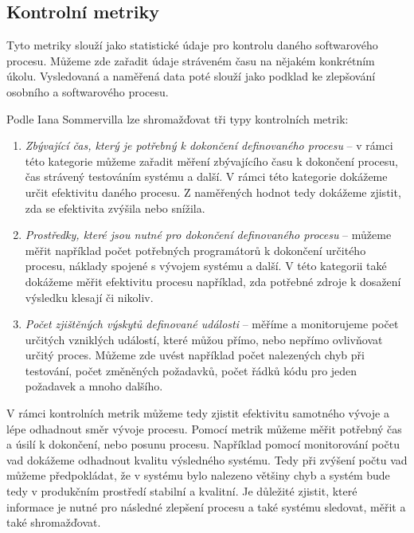 \documentclass[czech,master,public,dept460,male,cpdeclaration,oneside]{diploma}
\begin{document}
\subsection{Kontrolní metriky}
Tyto metriky slouží jako statistické údaje pro kontrolu daného softwarového procesu. Můžeme zde zařadit údaje stráveném času na nějakém konkrétním úkolu. Vysledovaná a naměřená data poté slouží jako podklad ke zlepšování osobního a softwarového procesu. 

Podle Iana Sommervilla \cite{ref:kontrolni_metriky} lze shromažďovat tři typy kontrolních metrik:

\begin{enumerate}
\item \textit{Zbývající čas, který je potřebný k dokončení definovaného procesu} -- v rámci této kategorie můžeme zařadit měření zbývajícího času k dokončení procesu, čas strávený testováním systému a další. V rámci této kategorie dokážeme určit efektivitu daného procesu. Z naměřených hodnot tedy dokážeme zjistit, zda se efektivita zvýšila nebo snížila.

\item \textit{Prostředky, které jsou nutné pro dokončení definovaného procesu} -- můžeme měřit například počet potřebných programátorů k dokončení určitého procesu, náklady spojené s vývojem systému a další. V této kategorii také dokážeme měřit efektivitu procesu například, zda potřebné zdroje k dosažení výsledku klesají či nikoliv.

\item \textit{Počet zjištěných výskytů definované události} -- měříme a monitorujeme počet určitých vzniklých událostí, které můžou přímo, nebo nepřímo ovlivňovat určitý proces. Můžeme zde uvést například počet nalezených chyb při testování, počet změněných požadavků, počet řádků kódu pro jeden požadavek a mnoho dalšího.

\end{enumerate}

V rámci kontrolních metrik můžeme tedy zjistit efektivitu samotného vývoje a lépe odhadnout směr vývoje procesu. Pomocí metrik můžeme měřit potřebný čas a úsilí k dokončení, nebo posunu procesu. Například pomocí monitorování počtu vad dokážeme odhadnout kvalitu výsledného systému. Tedy při zvýšení počtu vad můžeme předpokládat, že v systému bylo nalezeno většiny chyb a systém bude tedy v produkčním prostředí stabilní a kvalitní. Je důležité zjistit, které informace je nutné pro následné zlepšení procesu a také systému sledovat, měřit a také shromažďovat.
\end{document}
